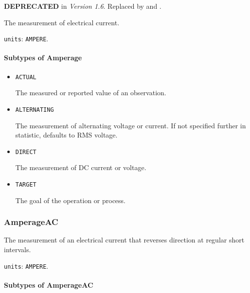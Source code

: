 \textbf{DEPRECATED} in \textit{Version 1.6}. Replaced by  and .

The measurement of electrical current.


\texttt{units}: \texttt{AMPERE}.

\paragraph{Subtypes of Amperage}\mbox{}
\label{sec:Subtypes of Amperage}

\begin{itemize}

\item \texttt{ACTUAL}


The measured or reported value of an \gls{observation}.

\item \texttt{ALTERNATING}


The measurement of alternating voltage or current.   If not specified further in statistic, defaults to RMS voltage. 

\item \texttt{DIRECT}


The measurement of DC current or voltage.

\item \texttt{TARGET}


The goal of the operation or process.


\end{itemize}







\subsubsection{AmperageAC}
\label{sec:AmperageAC}



The measurement of an electrical current that reverses direction at regular short intervals.


\texttt{units}: \texttt{AMPERE}.

\paragraph{Subtypes of AmperageAC}\mbox{}
\label{sec:Subtypes of AmperageAC}


